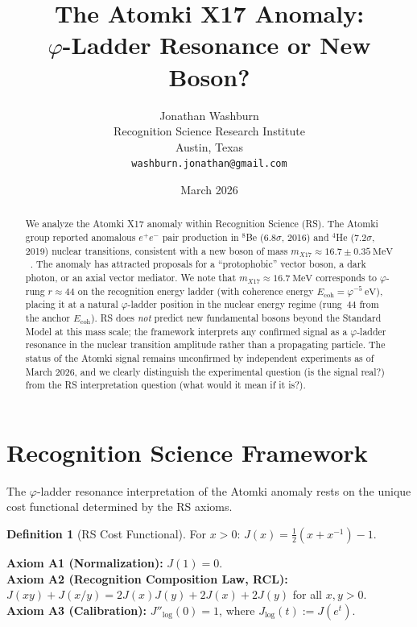 \documentclass[12pt,a4paper]{article}
\title{The Atomki X17 Anomaly:\\
$\varphi$-Ladder Resonance or New Boson?}
\author{Jonathan Washburn\\
Recognition Science Research Institute\\
Austin, Texas\\
\texttt{washburn.jonathan@gmail.com}}
\date{March 2026}
\theoremstyle{definition}
\newtheorem{definition}[theorem]{Definition}
\theoremstyle{remark}
\begin{document}
\maketitle

\begin{abstract}
We analyze the Atomki X17 anomaly within Recognition Science (RS).
The Atomki group reported anomalous $e^+e^-$ pair production in
${}^8$Be ($6.8\sigma$, 2016) and ${}^4$He ($7.2\sigma$, 2019) nuclear
transitions, consistent with a new boson of mass $m_{X17}
\approx 16.7 \pm 0.35~\mathrm{MeV}$~\cite{Atomki2016,Atomki2019}.
The anomaly has attracted proposals for a ``protophobic'' vector boson,
a dark photon, or an axial vector mediator.  We note that
$m_{X17} \approx 16.7~\mathrm{MeV}$ corresponds to $\varphi$-rung
$r \approx 44$ on the recognition energy ladder
(with coherence energy $E_{\mathrm{coh}} = \varphi^{-5}~\mathrm{eV}$),
placing it at a natural $\varphi$-ladder position in the nuclear
energy regime (rung~44 from the anchor $E_{\mathrm{coh}}$).  RS does \emph{not} predict new fundamental bosons
beyond the Standard Model at this mass scale; the framework
interprets any confirmed signal as a $\varphi$-ladder resonance in the
nuclear transition amplitude rather than a propagating particle.
The status of the Atomki signal remains unconfirmed by independent
experiments as of March 2026, and we clearly distinguish the
experimental question (is the signal real?) from the RS interpretation
question (what would it mean if it is?).
\end{abstract}

\section{Recognition Science Framework}
\label{sec:framework}

The $\varphi$-ladder resonance interpretation of the Atomki anomaly
rests on the unique cost functional determined by the RS axioms.

\begin{definition}[RS Cost Functional]
For $x > 0$: $J(x) = \tfrac{1}{2}(x + x^{-1}) - 1$.
\end{definition}

\noindent\textbf{Axiom A1 (Normalization):} $J(1) = 0$.\\
\textbf{Axiom A2 (Recognition Composition Law, RCL):}
$J(xy)+J(x/y)=2J(x)J(y)+2J(x)+2J(y)$ for all $x,y>0$.\\
\textbf{Axiom A3 (Calibration):} $J''_{\log}(0) = 1$, where
$J_{\log}(t) := J(e^t)$.
\end{document}
